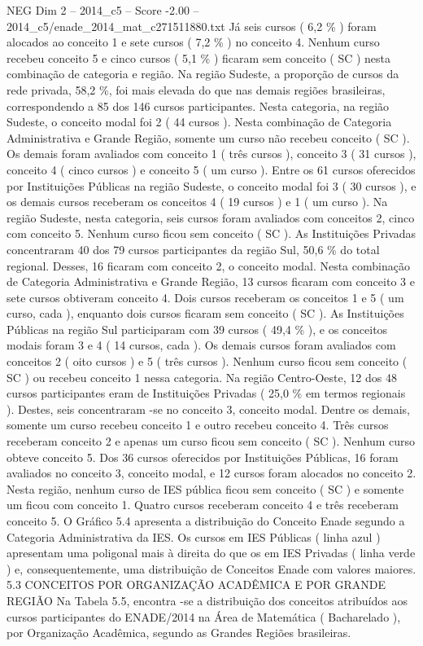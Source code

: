 \begin{textsample}{NEG Dim 2 – 2014\_c5 – Score -2.00 – 2014\_c5/enade\_2014\_mat\_c271511880.txt}
Já seis cursos ( 6,2 \% ) foram alocados ao conceito 1 e sete cursos ( 7,2 \% ) no conceito 4.
Nenhum curso recebeu conceito 5 e cinco cursos ( 5,1 \% ) ficaram sem conceito ( SC ) nesta combinação de categoria e região.
Na região Sudeste, a proporção de cursos da rede privada, 58,2 \%, foi mais elevada do que nas demais regiões brasileiras, correspondendo a 85 dos 146 cursos participantes.
Nesta categoria, na região Sudeste, o conceito modal foi 2 ( 44 cursos ).
Nesta combinação de Categoria Administrativa e Grande Região, somente um curso não recebeu conceito ( SC ).
Os demais foram avaliados com conceito 1 ( três cursos ), conceito 3 ( 31 cursos ), conceito 4 ( cinco cursos ) e conceito 5 ( um curso ).
Entre os 61 cursos oferecidos por Instituições Públicas na região Sudeste, o conceito modal foi 3 ( 30 cursos ), e os demais cursos receberam os conceitos 4 ( 19 cursos ) e 1 ( um curso ).
Na região Sudeste, nesta categoria, seis cursos foram avaliados com conceitos 2, cinco com conceito 5.
Nenhum curso ficou sem conceito ( SC ).
As Instituições Privadas concentraram 40 dos 79 cursos participantes da região Sul, 50,6 \% do total regional.
Desses, 16 ficaram com conceito 2, o conceito modal.
Nesta combinação de Categoria Administrativa e Grande Região, 13 cursos ficaram com conceito 3 e sete cursos obtiveram conceito 4.
Dois cursos receberam os conceitos 1 e 5 ( um curso, cada ), enquanto dois cursos ficaram sem conceito ( SC ).
As Instituições Públicas na região Sul participaram com 39 cursos ( 49,4 \% ), e os conceitos modais foram 3 e 4 ( 14 cursos, cada ).
Os demais cursos foram avaliados com conceitos 2 ( oito cursos ) e 5 ( três cursos ).
Nenhum curso ficou sem conceito ( SC ) ou recebeu conceito 1 nessa categoria.
Na região Centro-Oeste, 12 dos 48 cursos participantes eram de Instituições Privadas ( 25,0 \% em termos regionais ).
Destes, seis concentraram -se no conceito 3, conceito modal.
Dentre os demais, somente um curso recebeu conceito 1 e outro recebeu conceito 4.
Três cursos receberam conceito 2 e apenas um curso ficou sem conceito ( SC ).
Nenhum curso obteve conceito 5.
Dos 36 cursos oferecidos por Instituições Públicas, 16 foram avaliados no conceito 3, conceito modal, e 12 cursos foram alocados no conceito 2.
Nesta região, nenhum curso de IES pública ficou sem conceito ( SC ) e somente um ficou com conceito 1.
Quatro cursos receberam conceito 4 e três receberam conceito 5.
O Gráfico 5.4 apresenta a distribuição do Conceito Enade segundo a Categoria Administrativa da IES.
Os cursos em IES Públicas ( linha azul ) apresentam uma poligonal mais à direita do que os em IES Privadas ( linha verde ) e, consequentemente, uma distribuição de Conceitos Enade com valores maiores. 5.3 CONCEITOS POR ORGANIZAÇÃO ACADÊMICA E POR GRANDE REGIÃO Na Tabela 5.5, encontra -se a distribuição dos conceitos atribuídos aos cursos participantes do ENADE/2014 na Área de Matemática ( Bacharelado ), por Organização Acadêmica, segundo as Grandes Regiões brasileiras.

\end{textsample}
